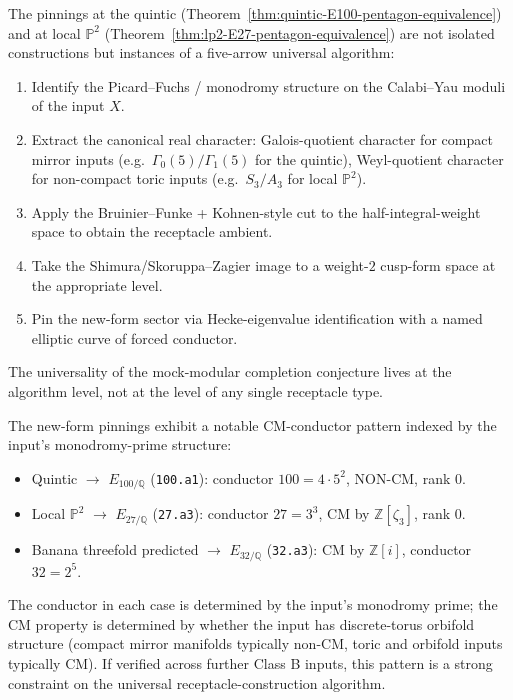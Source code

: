 \begin{remark}
\label{rem:universal-receptacle-algorithm}
The pinnings at the quintic
\textup{(}Theorem~\ref{thm:quintic-E100-pentagon-equivalence}\textup{)}
and at local $\mathbb{P}^2$
\textup{(}Theorem~\ref{thm:lp2-E27-pentagon-equivalence}\textup{)} are
not isolated constructions but instances of a five-arrow universal
algorithm:
\begin{enumerate}
\item Identify the Picard--Fuchs / monodromy structure on the
 Calabi--Yau moduli of the input $X$.
\item Extract the canonical real character: Galois-quotient character
 for compact mirror inputs (e.g.\ $\Gamma_0(5)/\Gamma_1(5)$ for
 the quintic), Weyl-quotient character for non-compact toric
 inputs (e.g.\ $S_3/A_3$ for local $\mathbb{P}^2$).
\item Apply the Bruinier--Funke + Kohnen-style cut to the
 half-integral-weight space to obtain the receptacle ambient.
\item Take the Shimura/Skoruppa--Zagier image to a weight-$2$
 cusp-form space at the appropriate level.
\item Pin the new-form sector via Hecke-eigenvalue identification with
 a named elliptic curve of forced conductor.
\end{enumerate}
The universality of the mock-modular completion conjecture lives at
the algorithm level, not at the level of any single receptacle type.
\end{remark}

\begin{remark}
\label{rem:CM-conductor-pattern}
The new-form pinnings exhibit a notable CM-conductor pattern indexed
by the input's monodromy-prime structure:
\begin{itemize}
\item Quintic $\to$ $E_{100/\mathbb{Q}}$
 \textup{(}\texttt{100.a1}\textup{):} conductor $100 = 4 \cdot 5^2$,
 NON-CM, rank $0$.
\item Local $\mathbb{P}^2$ $\to$ $E_{27/\mathbb{Q}}$
 \textup{(}\texttt{27.a3}\textup{):} conductor $27 = 3^3$, CM by
 $\mathbb{Z}[\zeta_3]$, rank $0$.
\item Banana threefold predicted $\to$ $E_{32/\mathbb{Q}}$
 \textup{(}\texttt{32.a3}\textup{):} CM by $\mathbb{Z}[i]$,
 conductor $32 = 2^5$.
\end{itemize}
The conductor in each case is determined by the input's monodromy
prime; the CM property is determined by whether the input has
discrete-torus orbifold structure (compact mirror manifolds typically
non-CM, toric and orbifold inputs typically CM). If verified across
further Class B inputs, this pattern is a strong constraint on the
universal receptacle-construction algorithm.
\end{remark}

